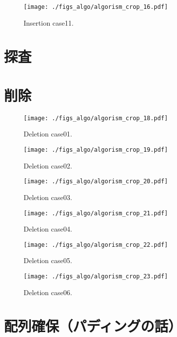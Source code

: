 \begin{figure}[h]
  \texttt{[image: ./figs\_algo/algorism\_crop\_16.pdf]}
  \caption{ Insertion case11. }
  \label{fig_IpCHashT_insert_hard_case11}
\end{figure}





\section{探査}


\section{削除}
\begin{figure}[h]
  \texttt{[image: ./figs\_algo/algorism\_crop\_18.pdf]}
  \caption{ Deletion case01. }
  \label{fig_IpCHashT_deletion_case01}
\end{figure}

\begin{figure}[h]
  \texttt{[image: ./figs\_algo/algorism\_crop\_19.pdf]}
  \caption{ Deletion case02. }
  \label{fig_IpCHashT_deletion_case02}
\end{figure}

\begin{figure}[h]
  \texttt{[image: ./figs\_algo/algorism\_crop\_20.pdf]}
  \caption{ Deletion case03. }
  \label{fig_IpCHashT_deletion_case03}
\end{figure}

\begin{figure}[h]
  \texttt{[image: ./figs\_algo/algorism\_crop\_21.pdf]}
  \caption{ Deletion case04. }
  \label{fig_IpCHashT_deletion_case04}
\end{figure}

\begin{figure}[h]
  \texttt{[image: ./figs\_algo/algorism\_crop\_22.pdf]}
  \caption{ Deletion case05. }
  \label{fig_IpCHashT_deletion_case05}
\end{figure}

\begin{figure}[h]
  \texttt{[image: ./figs\_algo/algorism\_crop\_23.pdf]}
  \caption{ Deletion case06. }
  \label{fig_IpCHashT_deletion_case06}
\end{figure}

\section{配列確保（パディングの話）}









